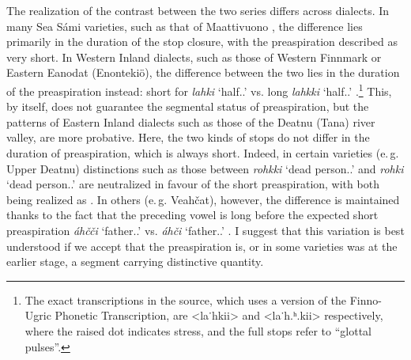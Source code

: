 \documentclass[output=paper,colorlinks,citecolor=brown]{langscibook}
\begin{document}
The realization of the contrast between the two series differs across dialects. In many Sea Sámi varieties, such as that of Maattivuono \parencite[17--18]{ravila1932}, the difference lies primarily in the duration of the stop closure, with the preaspiration described as very short. In Western Inland dialects, such as those of Western Finnmark or Eastern Eanodat (Enontekiö), the difference between the two lies in the duration of the preaspiration instead: short \ipa{[lɑhkiː]} for \textit{lahki} `half.\Gen.\Sg' vs. long \ipa{[lɑhːkiː]} \textit{lahkki} `half.\Nom.\Sg' \parencite[130]{sammallahti2019láidehus}.\footnote{The exact transcriptions in the source, which uses a version of the Finno-Ugric Phonetic Transcription, are <la˙hkii> and <la˙h.ʰ.kii> respectively, where the raised dot indicates stress, and the full stops refer to \enquote{glottal pulses}.} This, by itself, does not guarantee the segmental status of preaspiration, but the patterns of Eastern Inland dialects such as those of the Deatnu (Tana) river valley, are more probative. Here, the two kinds of stops do not differ in the duration of preaspiration, which is always short. Indeed, in certain varieties (e.\,g. Upper Deatnu) distinctions such as those between \textit{rohkki} `dead person.\Nom.\Sg' and \textit{rohki} `dead person.\Gen.\Sg' are neutralized in favour of the short preaspiration, with both being realized as \ipa{[rohkiː]} \parencite[141]{sammallahti2019láidehus}. In others (e.\,g. Veahčat), however, the difference is maintained thanks to the fact that the preceding vowel is long before the expected short preaspiration \textit{áhčči} `father.\Nom.\Sg'  vs. \textit{áhči} `father.\Gen.\Sg'  \parencite[163]{sammallahti2019láidehus}. I suggest that this variation is best understood if we accept that the preaspiration \ipa{[h]} is, or in some varieties was at the earlier stage, a segment carrying distinctive quantity.
\end{document}
